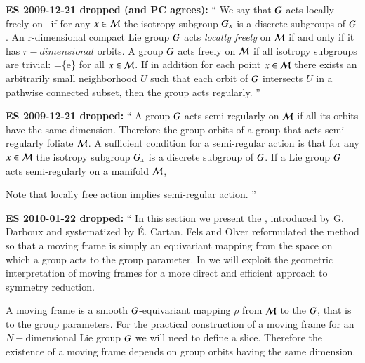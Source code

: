  {\bf ES 2009-12-21 dropped (and PC agrees):}
``
We say that $G$ acts locally freely on \pS\ if for any
$x\in{\cal M}$ the isotropy subgroup $G_{x}$ is a
discrete subgroups of $G$. An r-dimensional compact Lie
group $G$ acts \emph{locally freely} on ${\cal M}$ if and
only if it has $r-dimensional$ orbits. A
group $G$ acts freely on ${\cal M}$ if all isotropy subgroups
are trivial: \stab{\ssp}=\{e\} for all $x\in \mathcal{M}$. If
in addition for each point $x\in \mathcal{M}$ there exists an
arbitrarily small neighborhood $U$ such that each orbit of
$G$ intersects $U$ in a pathwise connected subset, then
the group acts regularly.
''

{\bf ES 2009-12-21 dropped:}
``
A group $G$ acts semi-regularly on ${\cal M}$ if all its
orbits have the same dimension. Therefore the group orbits of
a group that acts semi-regularly foliate ${\cal M}$. A sufficient
condition for a semi-regular action is that for any
$x\in{\cal M}$ the isotropy subgroup $G_{x}$ is a
discrete subgroup of $G$. If a Lie group $G$ acts
semi-regularly on a manifold $\mathcal{M}$,

Note that locally free action implies semi-regular action.
''

{\bf ES 2010-01-22 dropped:}
``
In this section we present the {\mframes}, introduced by G. Darboux and
systematized by \'E. Cartan.
Fels and Olver reformulated the method so that a
moving frame is simply an equivariant mapping from the space on which a
group acts to the group parameter.  In  we will
exploit the geometric interpretation of moving frames for a more direct and
efficient approach to symmetry reduction. 

A moving frame is a smooth
$G$-equivariant mapping $\rho$ from $\mathcal{M}$ to the
$G$, that is to the group parameters.  For the practical
construction of a moving frame for an $N-$dimensional Lie group
$G$ we will need to define a slice.
Therefore the existence of a moving frame depends on
group orbits having the same dimension.

